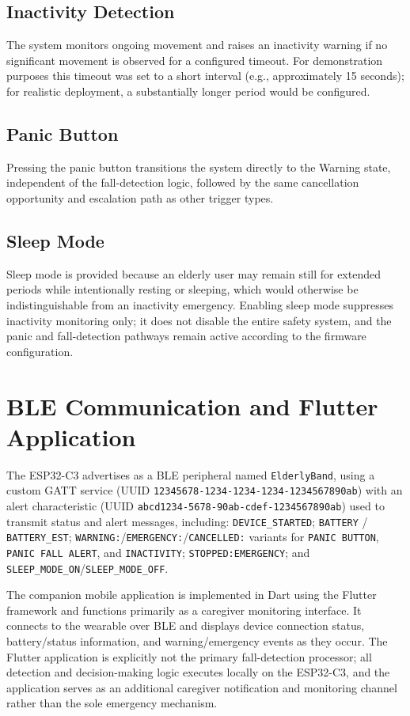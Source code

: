 \documentclass[lettersize,journal]{IEEEtran}
\begin{document}
\subsection{Inactivity Detection}
The system monitors ongoing movement and raises an inactivity warning if no significant movement is observed for a configured timeout. For demonstration purposes this timeout was set to a short interval (e.g., approximately 15 seconds); for realistic deployment, a substantially longer period would be configured.

\subsection{Panic Button}
Pressing the panic button transitions the system directly to the Warning state, independent of the fall-detection logic, followed by the same cancellation opportunity and escalation path as other trigger types.

\subsection{Sleep Mode}
Sleep mode is provided because an elderly user may remain still for extended periods while intentionally resting or sleeping, which would otherwise be indistinguishable from an inactivity emergency. Enabling sleep mode suppresses inactivity monitoring only; it does not disable the entire safety system, and the panic and fall-detection pathways remain active according to the firmware configuration.

\section{BLE Communication and Flutter Application}
The ESP32-C3 advertises as a BLE peripheral named \texttt{ElderlyBand}, using a custom GATT service (UUID \texttt{12345678-1234-1234-1234-1234567890ab}) with an alert characteristic (UUID \texttt{abcd1234-5678-90ab-cdef-1234567890ab}) used to transmit status and alert messages, including: \texttt{DEVICE\_STARTED}; \texttt{BATTERY} / \texttt{BATTERY\_EST}; \texttt{WARNING:}/\texttt{EMERGENCY:}/\texttt{CANCELLED:} variants for \texttt{PANIC BUTTON}, \texttt{PANIC FALL ALERT}, and \texttt{INACTIVITY}; \texttt{STOPPED:EMERGENCY}; and \texttt{SLEEP\_MODE\_ON}/\texttt{SLEEP\_MODE\_OFF}.

The companion mobile application is implemented in Dart using the Flutter framework and functions primarily as a caregiver monitoring interface. It connects to the wearable over BLE and displays device connection status, battery/status information, and warning/emergency events as they occur. The Flutter application is explicitly not the primary fall-detection processor; all detection and decision-making logic executes locally on the ESP32-C3, and the application serves as an additional caregiver notification and monitoring channel rather than the sole emergency mechanism.
\end{document}
